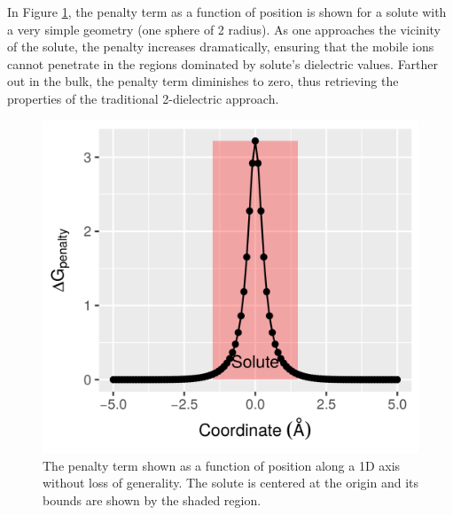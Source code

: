 \documentclass[9pt,tutorial]{livecoms}
\begin{document}
In Figure \ref{fig:plot_saltation_penalty}, the penalty term as a function of position is shown for a solute with a very simple geometry (one sphere of 2 \text{\AA} radius). As one approaches the vicinity of the solute, the penalty increases dramatically, ensuring that the mobile ions cannot penetrate in the regions dominated by solute’s dielectric values. Farther out in the bulk, the penalty term diminishes to zero, thus retrieving the properties of the traditional 2-dielectric approach.

\begin{figure}[hbt!]
\includegraphics[width=\linewidth]{Figure_2.png}
\caption{The penalty term shown as a function of position along a 1D axis without loss of generality. The solute is centered at the origin and its bounds are shown by the shaded region.}
\label{fig:plot_saltation_penalty}
\end{figure}
\end{document}
